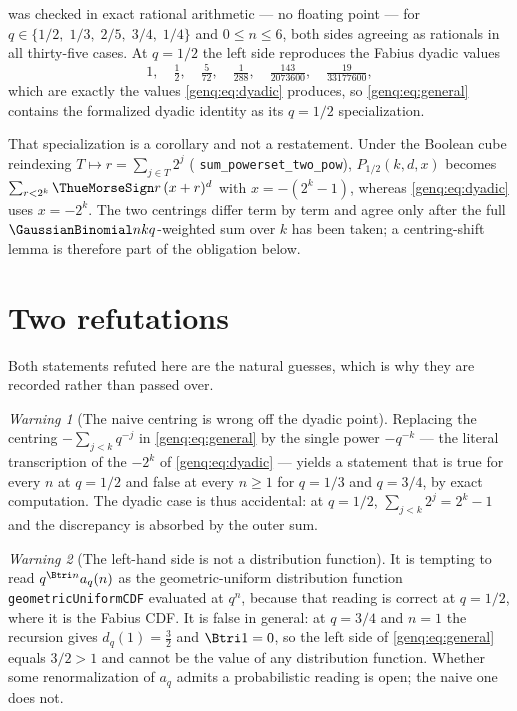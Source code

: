 \documentclass[11pt,oneside]{article}
\theoremstyle{definition}
\theoremstyle{remark}
\newtheorem{warning}[warning]{Warning}
\newcommand{\lean}[1]{%
  \ifmmode\text{\texttt{\detokenize{#1}}}\else\nolinkurl{#1}\fi}
\begin{document}
 was checked in exact rational arithmetic --- no floating
point --- for \(q\in\{1/2,\;1/3,\;2/5,\;3/4,\;1/4\}\) and \(0\le n\le6\), both
sides agreeing as rationals in all thirty-five cases.  At \(q=1/2\) the left
side reproduces the Fabius dyadic values
\[
  1,\quad \tfrac12,\quad \tfrac5{72},\quad \tfrac1{288},\quad
  \tfrac{143}{2073600},\quad \tfrac{19}{33177600},
\]
which are exactly the values \eqref{genq:eq:dyadic} produces, so
\eqref{genq:eq:general} contains the formalized dyadic identity as its
\(q=1/2\) specialization.

That specialization is a corollary and not a restatement.  Under the Boolean
cube reindexing \(T\mapsto r=\sum_{j\in T}2^{j}\)
(\lean{sum_powerset_two_pow}), \(P_{1/2}(k,d,x)\) becomes
\(\sum_{r<2^{k}}\ThueMorseSign r\,(x+r)^{d}\) with \(x=-(2^{k}-1)\), whereas
\eqref{genq:eq:dyadic} uses \(x=-2^{k}\).  The two centrings differ term by
term and agree only after the full \(\GaussianBinomial nkq\)-weighted sum over
\(k\) has been taken; a centring-shift lemma is therefore part of the
obligation below.

\section{Two refutations}
\label{genq:sec:negative}

Both statements refuted here are the natural guesses, which is why they are
recorded rather than passed over.

\begin{warning}[The naive centring is wrong off the dyadic point]
\label{genq:warn:centring}
Replacing the centring \(-\sum_{j<k}q^{-j}\) in \eqref{genq:eq:general} by the
single power \(-q^{-k}\) --- the literal transcription of the \(-2^{k}\) of
\eqref{genq:eq:dyadic} --- yields a statement that is true for every \(n\) at
\(q=1/2\) and false at every \(n\ge1\) for \(q=1/3\) and \(q=3/4\), by exact
computation.  The dyadic case is thus accidental: at \(q=1/2\),
\(\sum_{j<k}2^{j}=2^{k}-1\) and the discrepancy is absorbed by the outer sum.
\end{warning}

\begin{warning}[The left-hand side is not a distribution function]
\label{genq:warn:cdf}
It is tempting to read \(q^{\Btri n}a_{q}(n)\) as the geometric-uniform
distribution function \lean{geometricUniformCDF} evaluated at \(q^{n}\),
because that reading is correct at \(q=1/2\), where it is the Fabius
CDF.  It is false in general: at \(q=3/4\) and \(n=1\) the recursion gives
\(d_{q}(1)=\tfrac32\) and \(\Btri1=0\), so the left side of
\eqref{genq:eq:general} equals \(3/2>1\) and cannot be the value of any
distribution function.  Whether some renormalization of \(a_{q}\) admits a
probabilistic reading is open; the naive one does not.
\end{warning}
\end{document}
